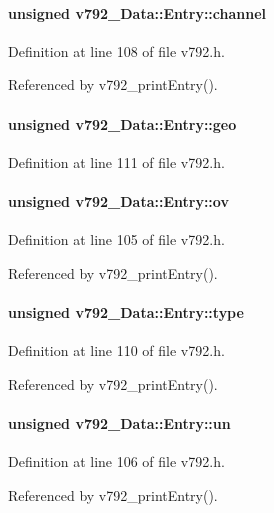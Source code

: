 \paragraph[{channel}]{\setlength{\rightskip}{0pt plus 5cm}unsigned {\bf v792\_\-Data::Entry::channel}}\hfill\label{structv792__Data_1_1Entry_a6513fbcd7e7b16ad3e78394ddafa68f4}


Definition at line 108 of file v792.h.

Referenced by v792\_\-printEntry().
\paragraph[{geo}]{\setlength{\rightskip}{0pt plus 5cm}unsigned {\bf v792\_\-Data::Entry::geo}}\hfill\label{structv792__Data_1_1Entry_aab183cccc893dc90c87741e9f8d6fea7}


Definition at line 111 of file v792.h.
\paragraph[{ov}]{\setlength{\rightskip}{0pt plus 5cm}unsigned {\bf v792\_\-Data::Entry::ov}}\hfill\label{structv792__Data_1_1Entry_a2797794b306294fda16f765237e73ee5}


Definition at line 105 of file v792.h.

Referenced by v792\_\-printEntry().
\paragraph[{type}]{\setlength{\rightskip}{0pt plus 5cm}unsigned {\bf v792\_\-Data::Entry::type}}\hfill\label{structv792__Data_1_1Entry_abe585d1f3cbed501084c6a9fcc1ebd2d}


Definition at line 110 of file v792.h.

Referenced by v792\_\-printEntry().
\paragraph[{un}]{\setlength{\rightskip}{0pt plus 5cm}unsigned {\bf v792\_\-Data::Entry::un}}\hfill\label{structv792__Data_1_1Entry_ac4b08fd05b8c14d10482fc40b31ad461}


Definition at line 106 of file v792.h.

Referenced by v792\_\-printEntry().